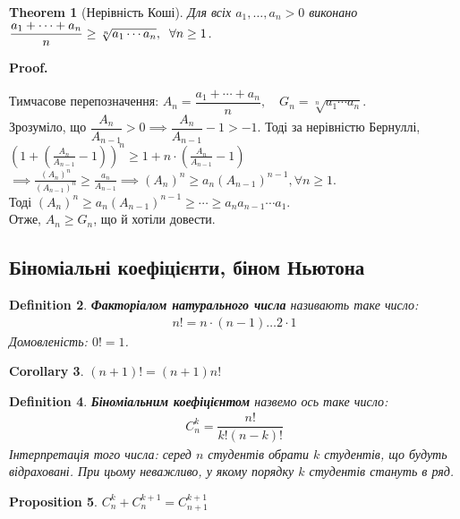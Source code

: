 \documentclass[a4paper, 14pt]{article}
\makeatletter
\def\qed{$\blacksquare$}
\theoremstyle{theoremdd}
\newtheorem{theorem}{Theorem}[subsection]
\theoremstyle{theoremdd}
\newtheorem{definition}[theorem]{Definition}
\theoremstyle{theoremdd}
\theoremstyle{theoremdd}
\theoremstyle{theoremdd}
\newtheorem{proposition}[theorem]{Proposition}
\theoremstyle{theoremdd}
\theoremstyle{theoremdd}
\theoremstyle{theoremdd}
\newtheorem{corollary}[theorem]{Corollary}
\renewenvironment{proof}[1][Proof.\\]{\par
\pushQED{\hfill \qed}%
\normalfont \topsep6\p@\@plus6\p@\relax
\trivlist
\item\relax
{\bfseries
#1\@addpunct{.}}\hspace\labelsep\ignorespaces
}{%
\popQED\endtrivlist\@endpefalse
}
\makeatother
\begin{document}
	\begin{theorem}[Нерівність Коші]
	Для всіх $a_1,\dots,a_n > 0$ виконано
	$\dfrac{a_1+\cdots+a_n}{n} \geq \sqrt[n]{a_1 \cdots a_n}, \hspace{0.2cm} \forall n \geq 1$.
	\end{theorem}
	
	\begin{proof}
	Тимчасове перепозначення: $A_n = \dfrac{a_1+\cdots+a_n}{n}, \quad G_n = \sqrt[n]{a_1 \cdots a_n}$.\\
	Зрозуміло, що $\dfrac{A_n}{A_{n-1}} > 0 \implies \dfrac{A_n}{A_{n-1}}-1>-1$. Тоді за нерівністю Бернуллі,\\
	$\displaystyle \left(1+ \left(\frac{A_n}{A_{n-1}} -1 \right) \right)^n \geq 1 + n \cdot \left(\frac{A_n}{A_{n-1}} -1 \right)$
	$\implies \displaystyle \frac{(A_n)^n}{(A_{n-1})^n} \geq \frac{a_n}{A_{n-1}} \implies \displaystyle (A_n)^n \geq a_n (A_{n-1})^{n-1}, \forall n \geq 1$. \\ Тоді $(A_n)^n \geq a_n (A_{n-1})^{n-1} \geq \cdots \geq a_n a_{n-1} \cdots a_1$. \\ Отже, $A_n \geq G_n$, що й хотіли довести.
	\end{proof}
	
	\subsection*{Біноміальні коефіцієнти, біном Ньютона}
	\begin{definition}
	\textbf{Факторіалом натурального числа} називають таке число:
	\begin{align*}
	n! = n \cdot (n-1) \dots 2 \cdot 1
	\end{align*}
	Домовленість: $0! = 1$.
	\end{definition}
	
	\begin{corollary} 
	$(n+1)! = (n+1)n!$
	\end{corollary}
	
	\begin{definition}
	\textbf{Біноміальним коефіцієнтом} назвемо ось таке число:
	\begin{align*}
	C_n^k = \dfrac{n!}{k!(n-k)!}
	\end{align*}
	Інтерпретація того числа: серед $n$ студентів обрати $k$ студентів, що будуть відраховані. При цьому неважливо, у якому порядку $k$ студентів стануть в ряд.
	\end{definition}

	\begin{proposition}
	$C_n^k + C_n^{k+1} = C_{n+1}^{k+1}$
	\end{proposition}
	
\end{document}
